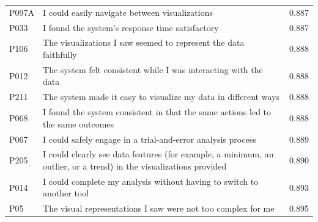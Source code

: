 \begin{table}[ht]
\begin{tabular}{llr}
P097A & I could easily navigate between visualizations & 0.887 \\
P033 & I found the system's response time satisfactory & 0.887 \\
P106 & The visualizations I saw seemed to represent the data faithfully & 0.888 \\
P012 & The system felt consistent while I was interacting with the data & 0.888 \\
P211 & The system made it easy to visualize my data in different ways & 0.888 \\
P068 & I found the system consistent in that the same actions led to the same outcomes & 0.888 \\
P067 & I could safely engage in a trial-and-error analysis process & 0.889 \\
P205 & I could clearly see data features (for example, a minimum, an outlier, or a trend) in the visualizations provided & 0.890 \\
P014 & I could complete my analysis without having to switch to another tool & 0.893 \\
P05 & The visual representations I saw were not too complex for me & 0.895 \\ \hline
\end{tabular}
\end{table}
